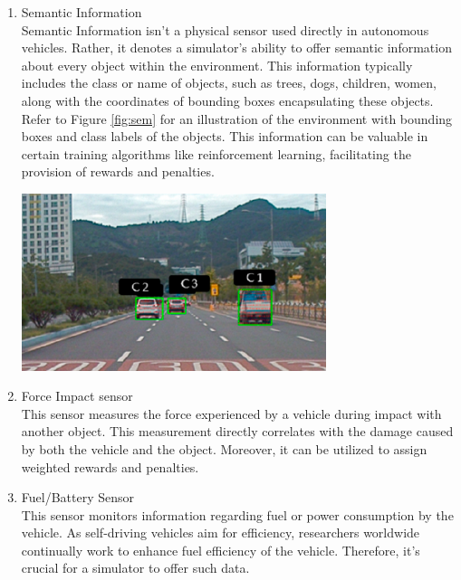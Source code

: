 \documentclass[12pt,twoside,a4paper,parskip]{scrbook} %
\begin{document}
\begin{enumerate}[label=\alph*.]
    \item Semantic Information \\
    Semantic Information isn't a physical sensor used directly in autonomous vehicles. Rather, it denotes a simulator's ability to offer semantic information about every object within the environment. This information typically includes the class or name of objects, such as trees, dogs, children, women, along with the coordinates of bounding boxes encapsulating these objects. Refer to Figure \ref{fig:sem} \cite{senimage} for an illustration of the environment with bounding boxes and class labels of the objects. This information can be valuable in certain training algorithms like reinforcement learning, facilitating the provision of rewards and penalties.
    \begin{minipage}[t]{\linewidth}
        \centering
        \includegraphics[width=0.70\textwidth]{Images/semantic.png}
        \label{fig:sem}
        \vspace{-\baselineskip} %
    \end{minipage}
    \hfill
    \item Force Impact sensor \\
    This sensor measures the force experienced by a vehicle during impact with another object. This measurement directly correlates with the damage caused by both the vehicle and the object. Moreover, it can be utilized to assign weighted rewards and penalties.

    \item Fuel/Battery Sensor \\
    This sensor monitors information regarding fuel or power consumption by the vehicle. As self-driving vehicles aim for efficiency, researchers worldwide continually work to enhance fuel efficiency of the vehicle. Therefore, it's crucial for a simulator to offer such data.


\end{enumerate}
\end{document}
